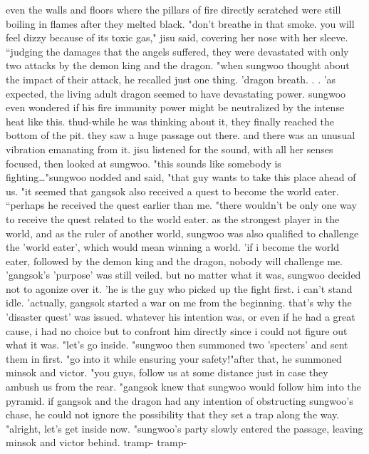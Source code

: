 even the walls and floors where the pillars of fire directly scratched were still boiling in flames after they melted black.
"don't breathe in that smoke.
 you will feel dizzy because of its toxic gas," jisu said, covering her nose with her sleeve.
``judging the damages that the angels suffered, they were devastated with only two attacks by the demon king and the dragon.
"when sungwoo thought about the impact of their attack, he recalled just one thing.
'dragon breath.
.
.
'as expected, the living adult dragon seemed to have devastating power.
 sungwoo even wondered if his fire immunity power might be neutralized by the intense heat like this.
thud-while he was thinking about it, they finally reached the bottom of the pit.
they saw a huge passage out there.
 and there was an unusual vibration emanating from it.
jisu listened for the sound, with all her senses focused, then looked at sungwoo.
"this sounds like somebody is fighting…"sungwoo nodded and said, "that guy wants to take this place ahead of us.
"it seemed that gangsok also received a quest to become the world eater.
 ``perhaps he received the quest earlier than me.
"there wouldn't be only one way to receive the quest related to the world eater.
as the strongest player in the world, and as the ruler of another world, sungwoo was also qualified to challenge the 'world eater', which would mean winning a world.
'if i become the world eater, followed by the demon king and the dragon, nobody will challenge me.
'gangsok's 'purpose' was still veiled.
 but no matter what it was, sungwoo decided not to agonize over it.
 'he is the guy who picked up the fight first.
 i can't stand idle.
'actually, gangsok started a war on me from the beginning.
 that's why the 'disaster quest' was issued.
 whatever his intention was, or even if he had a great cause, i had no choice but to confront him directly since i could not figure out what it was.
"let's go inside.
"sungwoo then summoned two 'specters' and sent them in first.
"go into it while ensuring your safety!"after that, he summoned minsok and victor.
"you guys, follow us at some distance just in case they ambush us from the rear.
"gangsok knew that sungwoo would follow him into the pyramid.
if gangsok and the dragon had any intention of obstructing sungwoo's chase, he could not ignore the possibility that they set a trap along the way.
"alright, let's get inside now.
"sungwoo's party slowly entered the passage, leaving minsok and victor behind.
tramp- tramp-

